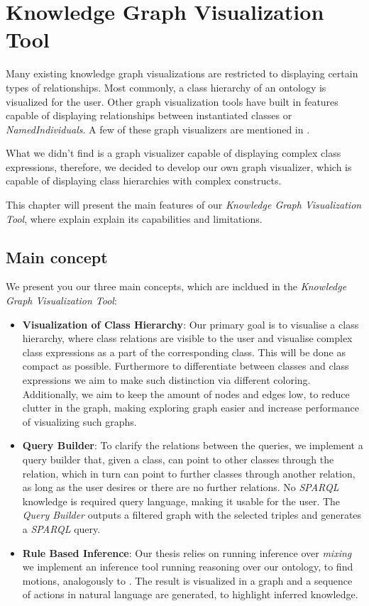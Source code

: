 \chapter{Knowledge Graph Visualization Tool}
\label{chap:OWLViz}
Many existing knowledge graph visualizations are restricted to displaying certain types of relationships. 
Most commonly, a class hierarchy of an ontology is visualized for the user. Other graph visualization tools have built in features capable of 
displaying relationships between instantiated classes or \textit{NamedIndividuals}.
A few of these graph visualizers are mentioned in .

What we didn't find is a graph visualizer capable of displaying complex class expressions, therefore, we decided to develop our own graph visualizer, 
which is capable of displaying class hierarchies with complex constructs.

This chapter will present the main features of our \textit{Knowledge Graph Visualization Tool}, where explain explain its capabilities and limitations.

\section{Main concept}
\label{sec:MainConceps}

We present you our three main concepts, which are incldued in the \textit{Knowledge Graph Visualization Tool}:
\begin{itemize}
    \item \textbf{Visualization of Class Hierarchy}: Our primary goal is to visualise a class hierarchy, where class relations are visible to the 
    user and visualise complex class expressions as a part of the corresponding class. This will be done as compact as possible. 
    Furthermore to differentiate between classes and class expressions we aim to make such distinction via different coloring. 
    Additionally, we aim to keep the amount of nodes and edges low, to reduce clutter in the graph, making exploring graph easier and 
    increase performance of visualizing such graphs.  
    \item \textbf{Query Builder}: To clarify the relations between the queries, we implement a query builder that, given a class, can point to other classes through the relation, 
    which in turn can point to further classes through another relation, as long as the user desires or there are no further relations. 
    No \textit{SPARQL} knowledge is required query language, making it usable for the user. 
    The \textit{Query Builder} outputs a filtered graph with the selected triples and generates a \textit{SPARQL} query.
    \item \textbf{Rule Based Inference}: Our thesis relies on running inference over \textit{mixing} 
    we implement an inference tool running reasoning over our ontology, to find motions, analogously to .
    The result is visualized in a graph and a sequence of actions in natural language are generated, to highlight inferred knowledge.  
\end{itemize}

